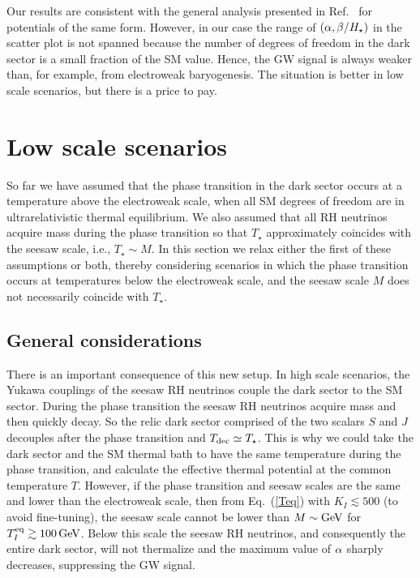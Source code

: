 \documentclass[a4paper,11pt]{article}
\begin{document}
Our results are consistent with the general analysis presented
in Ref.~\cite{Ellis:2020awk} for potentials of the same form. However, in our case the range of $(\alpha, \beta/H_\star)$
in the scatter plot is not spanned because
the number of degrees of freedom in the dark sector is a small fraction of the SM value. Hence,
the GW signal is always weaker than, for example, from electroweak baryogenesis. 
The situation is better in low scale scenarios, but there is a price to pay.


\section{Low scale scenarios}

So far we have assumed that the phase transition in the dark sector occurs at a temperature above the electroweak scale, when all SM degrees of freedom are in ultrarelativistic thermal equilibrium. 
We also assumed that all  RH neutrinos acquire mass during the phase transition 
so that $T_\star$  approximately coincides with the seesaw scale, i.e., $T_\star \sim M$.  
In this section we relax either the first of these assumptions or both, thereby considering scenarios in which the  phase transition occurs at temperatures below the electroweak scale, and the seesaw scale $M$ does not necessarily coincide with $T_\star$.

\subsection{General considerations}

There is an important consequence of this new setup. In high scale scenarios, the Yukawa couplings of the seesaw RH neutrinos
couple the dark sector to the SM sector. During the phase transition 
the seesaw RH neutrinos acquire mass and then quickly decay. So the relic dark sector comprised of the two scalars $S$ and $J$ decouples after the phase transition and $T_{\rm dec} \simeq T_{\star}$.
This is why  we could take the dark sector and the SM thermal bath to have the same temperature during the phase transition,
and calculate the effective thermal potential at the common temperature $T$.
However, if the phase transition and seesaw scales are the same and lower than the electroweak scale, then from
Eq.~(\ref{Teq}) with $K_I \lesssim 500$ (to avoid fine-tuning),
the seesaw scale cannot be lower than $M \sim {\rm GeV}$ for $T^{\rm eq}_I \gtrsim 100\,{\rm GeV}$. 
Below this scale the seesaw RH neutrinos, and consequently the entire 
dark sector, will not thermalize and the maximum value of $\alpha$ sharply decreases, suppressing the GW signal.  
\end{document}
